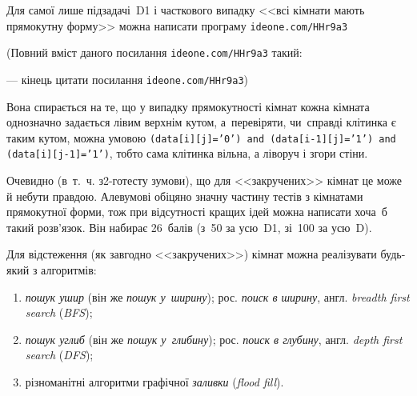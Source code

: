 \documentclass[14pt,a4paper]{extarticle}
\renewcommand{\baselinestretch}{1.3125}
\begin{document}
\Tutorial	{}
Для самої лише підзадачі~D1 і часткового випадку <<всі кімнати мають прямокутну форму>> можна написати програму 
\verb"ideone.com/HHr9a3"


{\color{green}\begin{small}

\renewcommand{\baselinestretch}{0.875}

(Повний вміст даного посилання \verb"ideone.com/HHr9a3" такий:

--- кінець цитати посилання \verb"ideone.com/HHr9a3")

\end{small}}


\hspace{0.5em plus 1em}
Вона спирається на те, що у випадку прямокутності кімнат кожна кімната однозначно задається лівим верхнім кутом, а~перевіряти, чи~справді клітинка є таким кутом, можна умовою \texttt{\mbox{(data[i][j]='0')} \mbox{and} \mbox{(data[i-1][j]='1')} \mbox{and} \mbox{(data[i][j-1]='1')}}, тобто сама клітинка вільна, а ліворуч і згори стіни.

Очевидно (в~т.~ч. з\nolinebreak[3] \mbox{2-го}\nolinebreak[3] тесту з\nolinebreak[3] умови), що для <<закручених>> кімнат це може й не\nolinebreak[3] бути правдою. Але\nolinebreak[2] в\nolinebreak[3] умові обіцяно значну частину тестів з кімнатами прямокутної форми, тож при відсутності кращих ідей можна написати хоча~б такий розв’язок. Він набирає 26~балів (з~50 за усю~D1, зі~100 за усю~D).



Для відстеження (як завгодно <<закручених>>) кімнат можна реалізувати будь-який з алгоритмів:

\begin{enumerate}

\item	
\emph{пошук ушир} (він же \emph{пошук у~ширину}); рос. \emph{поиск в ширину}, англ. \emph{breadth first search} (\emph{BFS});

\item
\emph{пошук углиб} (він же \emph{пошук у~глибину}); рос. \emph{поиск в глубину}, англ. \emph{depth first search} (\emph{DFS});

\item
різноманітні алгоритми графічної \emph{заливки} (\emph{flood fill}).

\end{enumerate}
\end{document}
